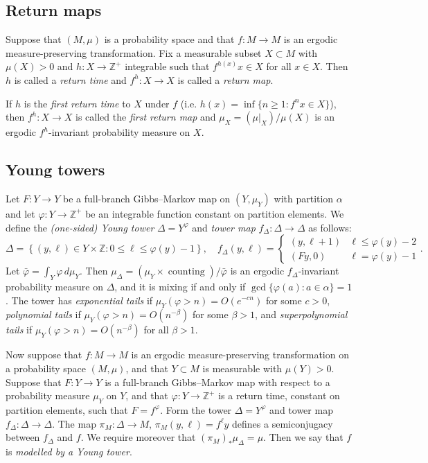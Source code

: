\documentclass[AHL,Unicode,longabstracts,published]{cedram}
\newcommand{\Z}{\mathbb{Z}}
\DeclareMathOperator{\counting}{counting}
\newcommand{\bvarphi}{\bar{\varphi}}
\begin{document}
\subsection{Return maps}
Suppose that $(M,\mu)$ is a probability space and that $f:M\to M$ is an ergodic measure-preserving transformation. Fix a measurable subset $X\subset M$ with $\mu(X)>0$ and $h:X\to\Z^+$ integrable such that $f^{h(x)}x\in X$ for all $x\in X$. Then $h$ is called a \emph{return time} and $f^h:X\to X$ is called a \emph{return map}.

If $h$ is the \emph{first return time} to $X$ under $f$ (i.e. $h(x)=\inf\{n\ge1:f^nx\in X\}$), then $f^h:X\to X$ is called the {\em first return map} and $\mu_X=(\mu|_X)/\mu(X)$ is an ergodic $f^h$-invariant probability measure on $X$.


\subsection{Young towers}

Let $F:Y\to Y$ be a full-branch Gibbs--Markov map on $(Y,\mu_Y)$ with partition $\alpha$ and let $\varphi:Y\to\Z^+$ be an integrable function constant on partition elements. We define the \emph{(one-sided) Young tower} $\Delta=Y^\varphi$ and \emph{tower map} $f_\Delta:\Delta\to\Delta$ as follows:
\[
\Delta=\left\{(y,\ell)\in Y\times\Z: 0\le \ell\le \varphi(y)-1\right\},
\quad f_\Delta(y,\ell)=
\begin{cases}
(y,\ell+1) & \ell\le\varphi(y)-2 \\
(Fy,0) & \ell=\varphi(y)-1
\end{cases}.
\]
Let $\bvarphi=\int_Y\varphi\,d\mu_Y$. Then $\mu_\Delta=(\mu_Y\times\counting)/\bvarphi$ is an ergodic $f_\Delta$-invariant probability measure on $\Delta$, and it is mixing if and only if $\gcd\{\varphi(a):a\in\alpha\}=1$. The tower has \emph{exponential tails} if $\mu_Y(\varphi>n)=O(e^{-cn})$ for some $c>0$, \emph{polynomial tails} if $\mu_Y(\varphi>n)=O(n^{-\beta})$ for some $\beta>1$, and \emph{superpolynomial tails} if $\mu_Y(\varphi>n)=O(n^{-\beta})$ for all $\beta>1$.

Now suppose that $f:M\to M$ is an ergodic measure-preserving transformation on a probability space $(M,\mu)$, and that $Y\subset M$ is measurable with $\mu(Y)>0$. Suppose that $F:Y\to Y$ is a full-branch Gibbs--Markov map with respect to a probability measure $\mu_Y$ on $Y$, and that $\varphi:Y\to \Z^+$ is a return time, constant on partition elements, such that $F=f^\varphi$. Form the tower $\Delta=Y^\varphi$ and tower map $f_\Delta:\Delta\to\Delta$. The map $\pi_M:\Delta\to M$, $\pi_M(y,\ell)=f^\ell y$ defines a semiconjugacy between $f_\Delta$ and $f$. We require moreover that $(\pi_M)_*\mu_\Delta=\mu$. Then we say that $f$ is \emph{modelled by a Young tower}.
\end{document}
